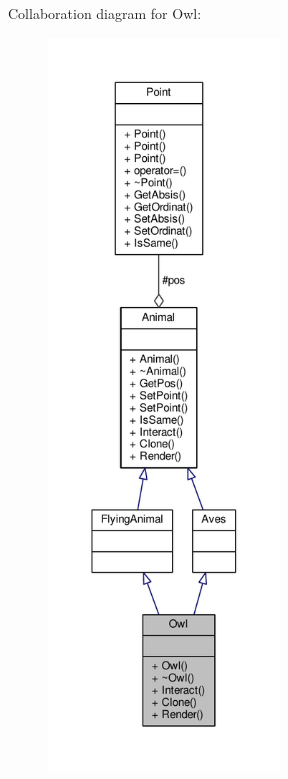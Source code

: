 Collaboration diagram for Owl\+:
\nopagebreak
\begin{figure}[H]
\begin{center}
\leavevmode
\includegraphics[height=550pt]{classOwl__coll__graph}
\end{center}
\end{figure}
